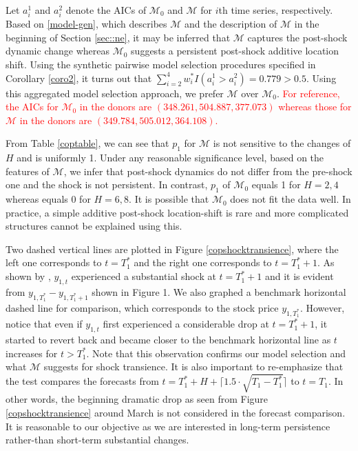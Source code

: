 \documentclass[11pt]{article}
\def\mc#1{\mathcal{#1}} %
\def\mc#1{\mathcal{#1}}
\newcommand{\ceil}[1]{\lceil #1 \rceil}
\theoremstyle{definition}
\begin{document}
Let $a_i^1$ and $a_i^2$ denote the AICs of $\mc{M}_0$ and $\mc{M}$ for $i$th time series, respectively. Based on \eqref{model-gen}, which describes $\mc{M}$ and the description of $\mc{M}$ in the beginning of Section \ref{sec::ne}, it may be inferred that $\mc{M}$ captures the post-shock dynamic change whereas $\mc{M}_0$ suggests a persistent post-shock additive location shift. Using the synthetic pairwise model selection procedures specified in Corollary \ref{coro2}, it turns out that $\sum_{i=2}^4 w_i^* I(a_i^1 > a_i^2)=0.779 >0.5$. Using this aggregated model selection approach, we prefer $\mc{M}$ over $\mc{M}_0$. \textcolor{red}{For reference, the AICs for $\mc{M}_0$ in the donors are $(348.261, 504.887, 377.073)$ whereas those for $\mc{M}$ in the donors are $(349.784, 505.012, 364.108)$. }

From Table \ref{coptable}, we can see that $p_1$ for $\mc{M}$ is not sensitive to the changes of $H$ and is uniformly 1. Under any reasonable significance level, based on the features of $\mc{M}$, we infer that post-shock dynamics do not differ from the pre-shock one and the shock is not persistent. In contrast, $p_1$ of $\mc{M}_0$ equals 1 for $H = 2, 4$ whereas equals 0 for $H = 6, 8$. It is possible that $\mc{M}_0$ does not fit the data well. In practice, a simple additive post-shock location-shift is rare and more complicated structures cannot be explained using this. 

Two dashed vertical lines are plotted in Figure \ref{copshocktransience}, where the left one corresponds to $t = T_1^*$ and the right one  corresponds to $t = T_1^*+1$. As shown by \cite{lin2021minimizing}, $y_{1,t}$ experienced a substantial shock at  $t = T_1^*+1$ and it is evident from $y_{1, T_1^*}-y_{1, T_1^*+1}$ shown in Figure 1. We also graphed a benchmark horizontal dashed line for comparison, which corresponds to the stock price $y_{1, T_1^*}$. However, notice that even if $y_{1,t}$ first experienced a considerable drop at $t = T_1^*+1$,   it started to revert back and became closer to the benchmark horizontal line as $t$ increases for $t > T_1^*$. Note that this observation confirms our model selection and what $\mc{M}$ suggests for shock transience. It is also important to re-emphasize that  the test compares the forecasts from $t = T_1^* + H+\ceil{1.5 \cdot \sqrt{T_1-T_1^*}}$ to $t=T_1$. In other words, the beginning dramatic drop as seen from Figure \ref{copshocktransience} around March is not considered in the forecast comparison. It is reasonable to our objective as we are interested in long-term persistence rather-than short-term substantial changes. 
\end{document}

